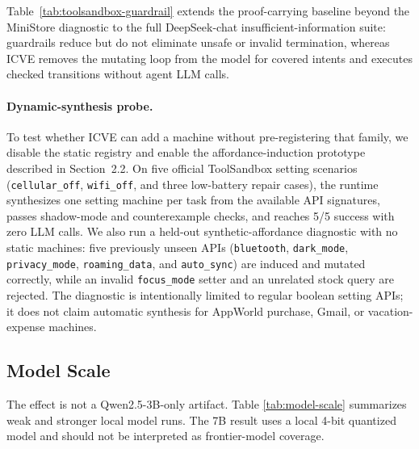 \documentclass[11pt]{article}
\begin{document}
Table~\ref{tab:toolsandbox-guardrail} extends the proof-carrying baseline beyond the
MiniStore diagnostic to the full DeepSeek-chat insufficient-information suite: guardrails
reduce but do not eliminate unsafe or invalid termination, whereas ICVE removes the
mutating loop from the model for covered intents and executes checked transitions without
agent LLM calls.

\paragraph{Dynamic-synthesis probe.}
To test whether ICVE can add a machine without pre-registering that family, we disable
the static registry and enable the affordance-induction prototype described in
Section~2.2. On five official ToolSandbox setting scenarios
(\texttt{cellular\_off}, \texttt{wifi\_off}, and three low-battery repair cases), the
runtime synthesizes one setting machine per task from the available API signatures,
passes shadow-mode and counterexample checks, and reaches 5/5 success with zero LLM
calls. We also run a held-out synthetic-affordance diagnostic with no static machines:
five previously unseen APIs (\texttt{bluetooth}, \texttt{dark\_mode},
\texttt{privacy\_mode}, \texttt{roaming\_data}, and \texttt{auto\_sync}) are induced and
mutated correctly, while an invalid \texttt{focus\_mode} setter and an unrelated stock
query are rejected. The diagnostic is intentionally limited to regular boolean setting
APIs; it does not claim automatic synthesis for AppWorld purchase, Gmail, or
vacation-expense machines.

\subsection{Model Scale}

The effect is not a Qwen2.5-3B-only artifact. Table \ref{tab:model-scale} summarizes weak
and stronger local model runs. The 7B result uses a local 4-bit quantized model and should
not be interpreted as frontier-model coverage.
\end{document}
